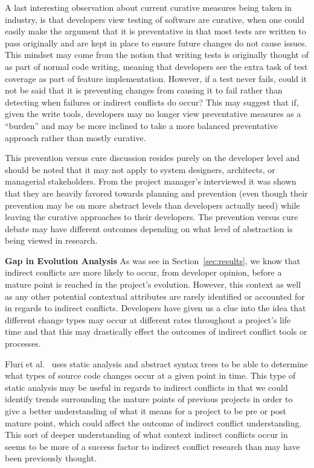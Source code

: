 \documentclass[conference]{IEEEtran}
\begin{document}
A last interesting observation about current curative measures being taken in industry, is that developers view testing of software 
are curative, when one could easily make the argument that it is preventative in that most tests are written to pass originally and
are kept in place to ensure future changes do not cause issues. This mindset may come from the notion that writing tests is originally
thought of as part of normal code writing, meaning that developers see the extra task of test coverage as part of feature implementation.
However, if a test never fails, could it not be said that it is preventing changes from causing it to fail rather than detecting
when failures or indirect conflicts do occur? This may suggest that if, given the write tools, developers may no longer view preventative
measures as a ``burden'' and may be more inclined to take a more balanced preventative approach rather than mostly curative.

This prevention versus cure discussion resides purely on the developer level and should be noted that it may not apply to system
designers, architects, or managerial stakeholders. 
From the project manager's interviewed it was shown that they are heavily favored towards planning and 
prevention (even though their prevention may be on more abstract levels than developers actually need) while leaving the curative
approaches to their developers. The prevention versus cure debate may have different outcomes depending on what level of abstraction
is being viewed in research.

\textbf{Gap in Evolution Analysis} As was see in Section~\ref{sec:results}, we know that indirect conflicts are more likely to occur,
from developer opinion, before a mature point is reached in the project's evolution. However, this context as well as any other
potential contextual attributes are rarely identified or accounted for in regards to indirect conflicts. Developers have given
us a clue into the idea that different change types may occur at different rates throughout a project's life time and that this
may drastically effect the outcomes of indirect conflict tools or processes.

Fluri et al.~\cite{Fluri:2007:CDT} uses static analysis and abstract syntax trees to be able to determine what types of source code
changes occur at a given point in time. This type of static analysis may be useful in regards to indirect conflicts in that we
could identify trends surrounding the mature points of previous projects in order to give a better understanding of what it
means for a project to be pre or post mature point, which could affect the outcome of indirect conflict understanding. This sort
of deeper understanding of what context indirect conflicts occur in seems to be more of a success factor to indirect conflict
research than may have been previously thought.
\end{document}
